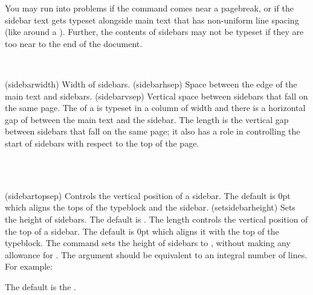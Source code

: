 




    You may run into problems if the \cmd{\sidebar} command comes near 
a pagebreak, or if the sidebar text gets typeset alongside main text that
has non-uniform line spacing (like around a \cmd{\section}). Further,
the contents of sidebars may not be typeset if they are too near to the
end of the document.

\begin{syntax}
\lnc{\sidebarwidth} \lnc{\sidebarhsep} \lnc{\sidebarvsep} \\
\end{syntax}
\glossary(sidebarwidth)%
  {}%
  {Width of sidebars.}
\glossary(sidebarhsep)%
  {}%
  {Space between the edge of the main text and sidebars.}
\glossary(sidebarvsep)%
  {}%
  {Vertical space between sidebars that fall on the same page.}
The  of a \cmd{\sidebar} is typeset in a column of width 
\lnc{\sidebarwidth} and there is a horizontal gap of \lnc{\sidebarhsep}
between the main text and the sidebar. The length \lnc{\sidebarvsep}
is the vertical gap between sidebars that fall on the same page; it also
has a role in controlling the start of sidebars with respect to the
top of the page.

\begin{syntax}
\lnc{\sidebartopsep} \\
\cmd{\setsidebarheight} \\
\end{syntax}
\glossary(sidebartopsep)%
  {}%
  {Controls the vertical position of a sidebar. The default is 0pt which
   aligns the tops of the typeblock and the sidebar.}
\glossary(setsidebarheight)%
  {}%
  {Sets the height of sidebars. The default is .}
The length \lnc{\sidebartopsep} controls the vertical position of the top
of a sidebar. The default is 0pt which aligns it with the top of the
typeblock.
The command \cmd{\setsidebarheight} sets the height of sidebars to
, without making any allowance for \lnc{\sidebartopsep}.
The  argument should be equivalent to an integral number 
of lines. For example:
\begin{lcode}
\setsidebarheight{15\onelineskip}
\end{lcode}
The default is the \lnc{\textheight}.

